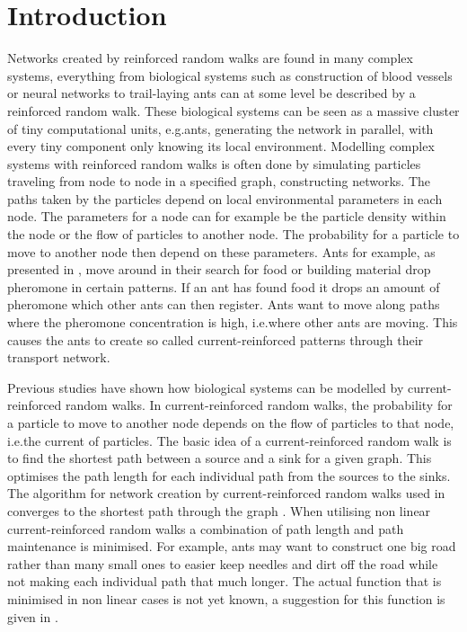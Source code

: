 \section{Introduction}
\label{sec:introduction}
Networks created by reinforced random walks are found in many complex systems, everything from biological systems such as construction of blood vessels or neural networks to trail-laying ants can at some level be described by a reinforced random walk. These biological systems can be seen as a massive cluster of tiny computational units, e.g.\@ ants, generating the network in parallel, with every tiny component only knowing its local environment. Modelling complex systems with reinforced random walks is often done by simulating particles traveling from node to node in a specified graph, constructing networks. The paths taken by the particles depend on local environmental parameters in each node. The parameters for a node can for example be the particle density within the node or the flow of particles to another node. The probability for a particle to move to another node then depend on these parameters. Ants for example, as presented in \cite{Schweitzer1997153}, move around in their search for food or building material drop pheromone in certain patterns. If an ant has found food it drops an amount of pheromone which other ants can then register. Ants want to move along paths where the pheromone concentration is high, i.e.\@ where other ants are moving. This causes the ants to create so called current-reinforced patterns through their transport network.

Previous studies have shown how biological systems can be modelled by current-reinforced random walks. In current-reinforced random walks, the probability for a particle to move to another node depends on the flow of particles to that node, i.e.\@ the current of particles. The basic idea of a current-reinforced random walk is to find the shortest path between a source and a sink for a given graph. This optimises the path length for each individual path from the sources to the sinks. The algorithm for network creation by current-reinforced random walks used in \cite{Sumpter} converges to the shortest path through the graph \cite{Ito}. When utilising non linear current-reinforced random walks a combination of path length and path maintenance is minimised. For example, ants may want to construct one big road rather than many small ones to easier keep needles and dirt off the road while not making each individual path that much longer. The actual function that is minimised in non linear cases is not yet known, a suggestion for this function is given in \cite{Sumpter}.

